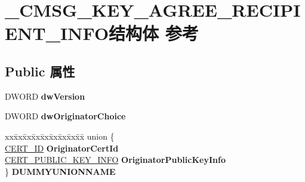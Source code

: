 \hypertarget{struct___c_m_s_g___k_e_y___a_g_r_e_e___r_e_c_i_p_i_e_n_t___i_n_f_o}{}\section{\+\_\+\+C\+M\+S\+G\+\_\+\+K\+E\+Y\+\_\+\+A\+G\+R\+E\+E\+\_\+\+R\+E\+C\+I\+P\+I\+E\+N\+T\+\_\+\+I\+N\+F\+O结构体 参考}
\label{struct___c_m_s_g___k_e_y___a_g_r_e_e___r_e_c_i_p_i_e_n_t___i_n_f_o}
\subsection*{Public 属性}
\begin{DoxyCompactItemize}
\item 
\mbox{\label{struct___c_m_s_g___k_e_y___a_g_r_e_e___r_e_c_i_p_i_e_n_t___i_n_f_o_aac59355d022a8ec3b4361227bcb1f2b2}} 
D\+W\+O\+RD {\bfseries dw\+Version}
\item 
\mbox{\label{struct___c_m_s_g___k_e_y___a_g_r_e_e___r_e_c_i_p_i_e_n_t___i_n_f_o_aa1003c733bd634f306cd23a134e43ae3}} 
D\+W\+O\+RD {\bfseries dw\+Originator\+Choice}
\item 
\mbox{\label{struct___c_m_s_g___k_e_y___a_g_r_e_e___r_e_c_i_p_i_e_n_t___i_n_f_o_a093fbdfc095fffba7ea3bf4af3e70a3d}} 
\begin{tabbing}
xx\=xx\=xx\=xx\=xx\=xx\=xx\=xx\=xx\=\kill
union \{\\
\>\hyperlink{struct___c_e_r_t___i_d}{CERT\_ID} {\bfseries OriginatorCertId}\\
\>\hyperlink{struct___c_e_r_t___p_u_b_l_i_c___k_e_y___i_n_f_o}{CERT\_PUBLIC\_KEY\_INFO} {\bfseries OriginatorPublicKeyInfo}\\
\} {\bfseries DUMMYUNIONNAME}\\


\end{tabbing}
\end{DoxyCompactItemize}
